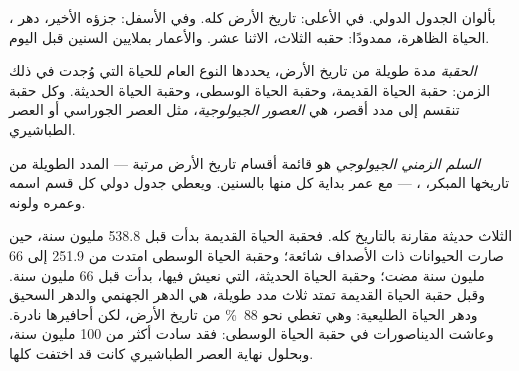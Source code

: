 \begin{omfigure}
{\small {}، بألوان الجدول الدولي. في الأعلى: تاريخ الأرض
كله. وفي الأسفل: جزؤه الأخير، دهر الحياة الظاهرة، ممدودًا: حقبه الثلاث،
 الاثنا عشر. والأعمار بملايين السنين قبل اليوم.}
\label{fig:g7:geological-time:scale}
\end{omfigure}

\begin{definition}\label{def:g7:geological-time:era-period}
\emph{الحقبة} مدة طويلة من تاريخ الأرض، يحددها النوع العام
للحياة التي وُجدت في ذلك الزمن: حقبة الحياة القديمة، وحقبة الحياة الوسطى،
وحقبة الحياة الحديثة. وكل حقبة تنقسم إلى مدد أقصر، هي \emph{العصور
الجيولوجية}، مثل العصر الجوراسي أو العصر الطباشيري.
\end{definition}

\begin{definition}\label{def:g7:geological-time:time-scale}
\emph{السلم الزمني الجيولوجي} هو قائمة أقسام
تاريخ الأرض مرتبة --- المدد الطويلة من تاريخها المبكر، ،  --- مع عمر بداية كل منها بالسنين. ويعطي جدول دولي كل قسم
اسمه وعمره ولونه.
\end{definition}


 الثلاث حديثة مقارنة بالتاريخ كله. فحقبة الحياة القديمة بدأت قبل
\num{538.8} مليون سنة، حين صارت  الحيوانات ذات الأصداف شائعة؛ وحقبة
الحياة الوسطى امتدت من \num{251.9} إلى \num{66} مليون سنة مضت؛ وحقبة
الحياة الحديثة،  التي نعيش فيها، بدأت قبل \num{66} مليون سنة. وقبل
حقبة الحياة القديمة تمتد ثلاث مدد طويلة، هي الدهر الجهنمي والدهر السحيق
ودهر الحياة الطليعية: وهي تغطي نحو 88~\% من تاريخ الأرض، لكن أحافيرها
نادرة. وعاشت الديناصورات في حقبة الحياة الوسطى: فقد سادت أكثر من
\num{100} مليون سنة، وبحلول نهاية العصر الطباشيري كانت قد اختفت كلها.

